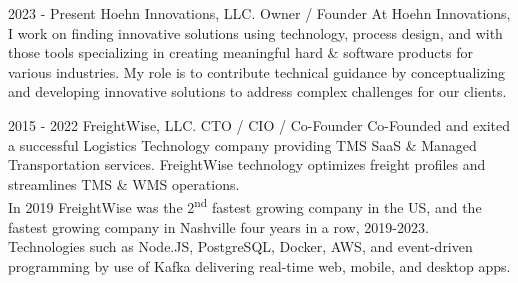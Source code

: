 \vfill\null
{}

\cvevent
{2023 - Present}
{Hoehn Innovations, LLC.}
{Owner / Founder}
{At Hoehn Innovations, I work on finding innovative solutions using technology,
process design, and with those tools specializing in creating meaningful hard \& software products for various industries. My role is to contribute technical guidance by conceptualizing and developing innovative solutions to address complex challenges for our clients.}
{}
{} %
{}


\vfill\null
\cvevent
{2015 - 2022}
{FreightWise, LLC.}
{CTO / CIO / Co-Founder}
{Co-Founded and exited a successful Logistics Technology company providing TMS SaaS \& Managed Transportation services. FreightWise technology optimizes freight profiles and streamlines TMS \& WMS operations.\\[6pt]
In 2019 FreightWise was the 2\textsuperscript{nd} fastest growing company in the US, and the fastest growing company in Nashville four years in a row, 2019-2023.\\[6pt]
Technologies such as Node.JS, PostgreSQL, Docker, AWS, and event-driven programming by use of Kafka delivering real-time web, mobile, and desktop apps.}
{}
{}
{}


